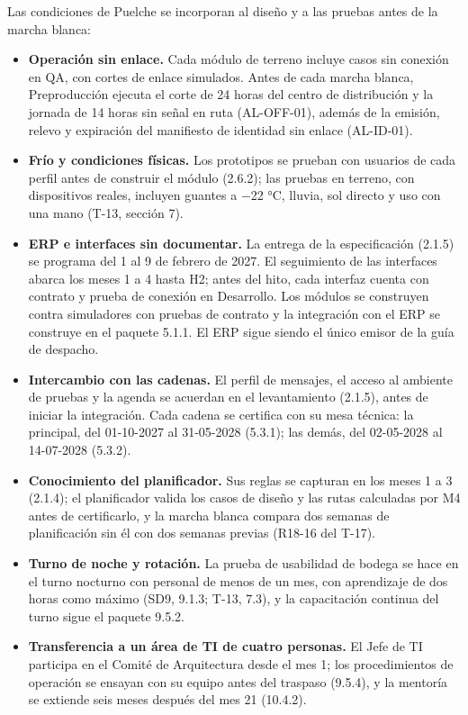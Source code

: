 \documentclass[carta,firma,final]{lafrox}
\begin{document}
Las condiciones de Puelche se incorporan al diseño y a las pruebas antes de la marcha blanca:
\begin{itemize}
  \item \textbf{Operación sin enlace.} Cada módulo de terreno incluye casos sin conexión en QA, con cortes de enlace simulados. Antes de cada marcha blanca, Preproducción ejecuta el corte de 24 horas del centro de distribución y la jornada de 14 horas sin señal en ruta (AL-OFF-01), además de la emisión, relevo y expiración del manifiesto de identidad sin enlace (AL-ID-01).
  \item \textbf{Frío y condiciones físicas.} Los prototipos se prueban con usuarios de cada perfil antes de construir el módulo (2.6.2); las pruebas en terreno, con dispositivos reales, incluyen guantes a −22 °C, lluvia, sol directo y uso con una mano (T-13, sección 7).
  \item \textbf{ERP e interfaces sin documentar.} La entrega de la especificación (2.1.5) se programa del 1 al 9 de febrero de 2027. El seguimiento de las interfaces abarca los meses 1 a 4 hasta H2; antes del hito, cada interfaz cuenta con contrato y prueba de conexión en Desarrollo. Los módulos se construyen contra simuladores con pruebas de contrato y la integración con el ERP se construye en el paquete 5.1.1. El ERP sigue siendo el único emisor de la guía de despacho.
  \item \textbf{Intercambio con las cadenas.} El perfil de mensajes, el acceso al ambiente de pruebas y la agenda se acuerdan en el levantamiento (2.1.5), antes de iniciar la integración. Cada cadena se certifica con su mesa técnica: la principal, del 01-10-2027 al 31-05-2028 (5.3.1); las demás, del 02-05-2028 al 14-07-2028 (5.3.2).
  \item \textbf{Conocimiento del planificador.} Sus reglas se capturan en los meses 1 a 3 (2.1.4); el planificador valida los casos de diseño y las rutas calculadas por M4 antes de certificarlo, y la marcha blanca compara dos semanas de planificación sin él con dos semanas previas (R18-16 del T-17).
  \item \textbf{Turno de noche y rotación.} La prueba de usabilidad de bodega se hace en el turno nocturno con personal de menos de un mes, con aprendizaje de dos horas como máximo (SD9, 9.1.3; T-13, 7.3), y la capacitación continua del turno sigue el paquete 9.5.2.
  \item \textbf{Transferencia a un área de TI de cuatro personas.} El Jefe de TI participa en el Comité de Arquitectura desde el mes 1; los procedimientos de operación se ensayan con su equipo antes del traspaso (9.5.4), y la mentoría se extiende seis meses después del mes 21 (10.4.2).
\end{itemize}
\end{document}

